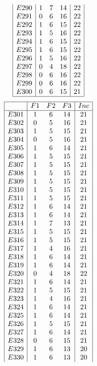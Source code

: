 \documentclass[12pt]{article}
\begin{document}
\begin{multicols}{3}
\begin{equation*}
\begin{array}{|c|ccc|c|}
E290&1&7&14&22\\
E291&0&6&16&22\\
E292&1&6&15&22\\
E293&1&5&16&22\\
E294&1&6&15&22\\
E295&1&6&15&22\\
E296&1&5&16&22\\
E297&0&4&18&22\\
E298&0&6&16&22\\
E299&0&6&16&22\\
E300&0&6&15&21\\
\hline
\end{array}
\end{equation*}
\begin{equation*}
\begin{array}{|c|ccc|c|}
\hline
&F1&F2&F3&Inc\\
\hline
E301&1&6&14&21\\
E302&0&5&16&21\\
E303&1&5&15&21\\
E304&0&5&16&21\\
E305&1&6&14&21\\
E306&1&5&15&21\\
E307&1&5&15&21\\
E308&1&5&15&21\\
E309&1&5&15&21\\
E310&1&5&15&21\\
E311&1&5&15&21\\
E312&1&6&14&21\\
E313&1&6&14&21\\
E314&1&7&13&21\\
E315&1&5&15&21\\
E316&1&5&15&21\\
E317&1&4&16&21\\
E318&1&6&14&21\\
E319&1&6&14&21\\
E320&0&4&18&22\\
E321&1&6&14&21\\
E322&1&5&15&21\\
E323&1&4&16&21\\
E324&1&6&14&21\\
E325&1&6&14&21\\
E326&1&5&15&21\\
E327&1&6&14&21\\
E328&0&6&15&21\\
E329&1&6&13&20\\
E330&1&6&13&20\\

\end{array}
\end{equation*}
\end{multicols}
\end{document}
